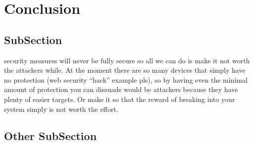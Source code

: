 %

\chapter{Conclusion}
\label{conc}


\section{SubSection}

security measures will never be fully secure so all we can do is make it not worth the attackers while. At the moment there are so many devices that simply have no protection (web security ``hack'' example pls), so by having even the minimal amount of protection you can dissuade would be attackers because they have plenty of easier targets. Or make it so that the reward of breaking into your system simply is not worth the effort.

\section{Other SubSection}